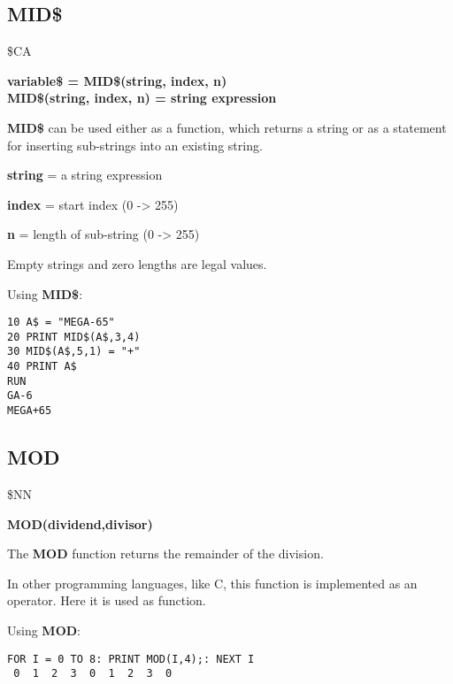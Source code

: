\subsection{MID\$}
\begin{description}[leftmargin=2cm,style=nextline]
\item [Token:] \$CA
\item [Format:] {\bf variable\$ = MID\$(string, index, n)} \\
                {\bf MID\$(string, index, n) = string expression}
\item [Usage:]  {\bf MID\$} can be used either as a function,
                which returns a string or as a statement for
                inserting sub-strings into an existing string.

               {\bf string} = a string expression

               {\bf index} = start index (0 -> 255)

               {\bf n} = length of sub-string (0 -> 255)

\item [Remarks:] Empty strings and zero lengths are legal values.

\item [Example:] Using {\bf MID\$}:
\begin{tcolorbox}[colback=black,coltext=white]
\verbatimfont{\codefont}
\begin{verbatim}
10 A$ = "MEGA-65"
20 PRINT MID$(A$,3,4)
30 MID$(A$,5,1) = "+"
40 PRINT A$
RUN
GA-6
MEGA+65
\end{verbatim}
\end{tcolorbox}
\end{description}


\newpage
\subsection{MOD}
\begin{description}[leftmargin=2cm,style=nextline]
\item [Token:] \$NN
\item [Format:] {\bf MOD(dividend,divisor)}
\item [Usage:] The {\bf MOD} function returns the remainder of the
      division.
\item [Remarks:] In other programming languages, like C, this function
      is implemented as an operator. Here it is used as function.

\item [Example:] Using {\bf MOD}:
\begin{tcolorbox}[colback=black,coltext=white]
\verbatimfont{\codefont}
\begin{verbatim}
FOR I = 0 TO 8: PRINT MOD(I,4);: NEXT I
 0  1  2  3  0  1  2  3  0
\end{verbatim}
\end{tcolorbox}
\end{description}

